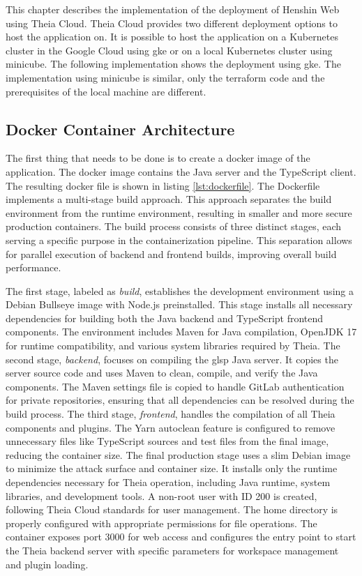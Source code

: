  This chapter describes the implementation of the deployment of Henshin Web using Theia Cloud. Theia Cloud provides two different deployment options to host the application on. It is possible to host the application on a Kubernetes cluster in the Google Cloud using \ac{gke} or on a local Kubernetes cluster using minicube. The following implementation shows the deployment using \ac{gke}. The implementation using minicube is similar, only the terraform code and the prerequisites of the local machine are different.

  \subsection{Docker Container Architecture}
  \label{subsec:docker-architecture}

  The first thing that needs to be done is to create a docker image of the application. The docker image contains the Java server and the TypeScript client. The resulting docker file is shown in listing \ref{lst:dockerfile}. The Dockerfile implements a multi-stage build approach. This approach separates the build environment from the runtime environment, resulting in smaller and more secure production containers. The build process consists of three distinct stages, each serving a specific purpose in the containerization pipeline. This separation allows for parallel execution of backend and frontend builds, improving overall build performance.

  The first stage, labeled as \textit{build}, establishes the development environment using a Debian Bullseye image with Node.js preinstalled. This stage installs all necessary dependencies for building both the Java backend and TypeScript frontend components. The environment includes Maven for Java compilation, OpenJDK 17 for runtime compatibility, and various system libraries required by Theia. The second stage, \textit{backend}, focuses on compiling the \ac{glsp} Java server. It copies the server source code and uses Maven to clean, compile, and verify the Java components. The Maven settings file is copied to handle GitLab authentication for private repositories, ensuring that all dependencies can be resolved during the build process. The third stage, \textit{frontend}, handles the compilation of all Theia components and plugins. The Yarn autoclean feature is configured to remove unnecessary files like TypeScript sources and test files from the final image, reducing the container size. The final production stage uses a slim Debian image to minimize the attack surface and container size. It installs only the runtime dependencies necessary for Theia operation, including Java runtime, system libraries, and development tools. A non-root user with ID 200 is created, following Theia Cloud standards for user management. The home directory is properly configured with appropriate permissions for file operations. The container exposes port 3000 for web access and configures the entry point to start the Theia backend server with specific parameters for workspace management and plugin loading.

